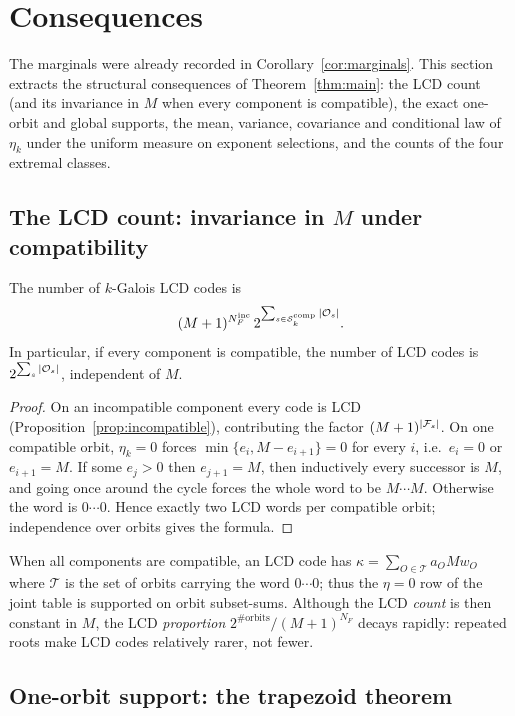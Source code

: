 \section{Consequences}\label{sec:consequences}

The marginals were already recorded in Corollary~\ref{cor:marginals}.  This
section extracts the structural consequences of Theorem~\ref{thm:main}: the
LCD count (and its invariance in $M$ when every component is compatible), the exact one-orbit and global supports,
the mean, variance, covariance and conditional law of $\eta_k$ under the
uniform measure on exponent selections, and the counts of the four extremal
classes.

\subsection{The LCD count: invariance in \texorpdfstring{$M$}{M} under compatibility}
\label{sec:lcd}

\begin{proposition}\label{prop:lcd-count}
The number of $k$-Galois LCD codes is
\[
(M+1)^{N_F^{\mathrm{inc}}}\,
2^{\sum_{s\in\mathcal{S}_k^{\mathrm{comp}}}|\mathcal O_s|}.
\]
In particular, if every component is compatible, the number of LCD codes is
$2^{\sum_s|\mathcal O_s|}$, independent of $M$.
\end{proposition}

\begin{proof}
On an incompatible component every code is LCD
(Proposition~\ref{prop:incompatible}), contributing the factor
$(M+1)^{|\mathcal F_s|}$.  On one compatible orbit, $\eta_k=0$ forces
$\min\{e_i,M-e_{i+1}\}=0$ for every $i$, i.e.\ $e_i=0$ or $e_{i+1}=M$.
If some $e_j>0$ then $e_{j+1}=M$, then inductively every successor is $M$, and
going once around the cycle forces the whole word to be $M\cdots M$.
Otherwise the word is $0\cdots0$.  Hence exactly two LCD words per compatible
orbit; independence over orbits gives the formula.
\end{proof}

When all components are compatible, an LCD code has
$\kappa=\sum_{O\in\mathcal{T}}a_OMw_O$ where $\mathcal{T}$ is the set of orbits
carrying the word $0\cdots0$; thus the $\eta=0$ row of the joint table is
supported on orbit subset-sums.  Although the LCD \emph{count} is then constant
in $M$, the LCD \emph{proportion} $2^{\#\mathrm{orbits}}/(M+1)^{N_F}$ decays
rapidly: repeated roots make LCD codes relatively rarer, not fewer.

\subsection{One-orbit support: the trapezoid theorem}\label{sec:support}

